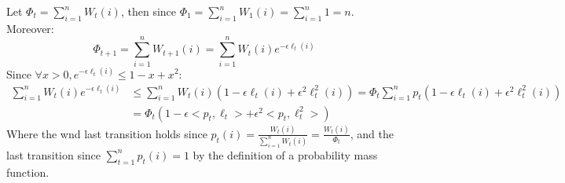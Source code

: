 Let $\Phi_t = \sum_{i=1}^n W_t(i)$, then since $\Phi_1 = \sum_{i=1}^n W_1(i) = \sum_{i=1}^n 1 = n$. 
Moreover:
\begin{equation*}
        \Phi_{t+1} = \sum_{i=1}^n W_{t+1}(i) = \sum_{i=1}^n W_t(i) e^{-\epsilon \ell_t(i)}
\end{equation*}
Since $\forall x>0, e^{-\epsilon \ell_t(i)} \leq 1 - x + x^2$:
\begin{equation*}
    \begin{split}
        \sum_{i=1}^n W_t(i) e^{-\epsilon \ell_t(i)} &\leq \sum_{i=1}^n W_t(i) (1 -\epsilon \ell_t(i) + \epsilon^2 \ell^2_t(i)) = \Phi_t \sum_{i=1}^n p_t (1 -\epsilon \ell_t(i) + \epsilon^2 \ell^2_t(i)) \\
        &= \Phi_t(1 - \epsilon <p_t, \ell_t> + \epsilon^2 <p_t, \ell^2_t>)
    \end{split}
\end{equation*}
Where the wnd last transition holds since $p_t(i) = \frac{W_t(i)}{\sum_{i=1}^n W_t(i)} = \frac{W_t(i)}{\Phi_t}$, and the last transition since $\sum_{t=1}^n p_t(i) = 1$ by the definition of a probability mass function.


